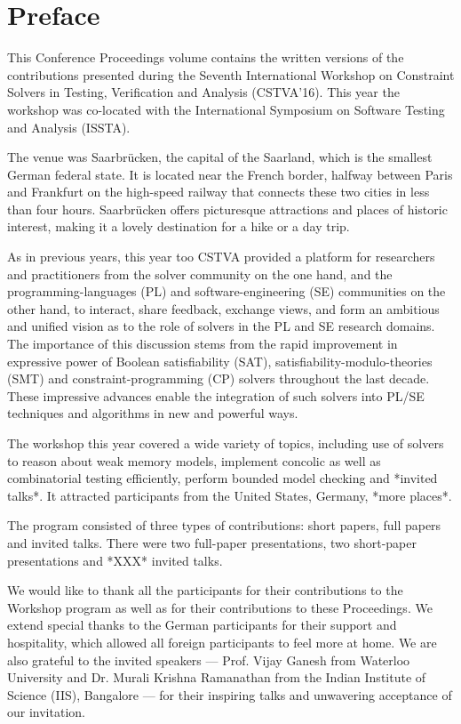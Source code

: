 \chapter*{Preface}
\setcounter{page}{1}
\pagestyle{plain}


This Conference Proceedings volume contains the written versions of the
contributions presented during the Seventh International Workshop on Constraint
Solvers in Testing, Verification and Analysis (CSTVA'16). This year the
workshop was co-located with the International Symposium on Software Testing
and Analysis (ISSTA).

The venue was Saarbr{\"u}cken, the capital of the Saarland, which is the
smallest German federal state. It is located near the French border, halfway
between Paris and Frankfurt on the high-speed railway that connects these two
cities in less than four hours. Saarbr{\"u}cken offers picturesque attractions
and places of historic interest, making it a lovely destination for a hike or a
day trip.  

As in previous years, this year too CSTVA provided a platform for researchers
and practitioners from the solver community on the one hand, and the
programming-languages (PL) and software-engineering (SE) communities on the
other hand, to interact, share feedback, exchange views, and form an ambitious
and unified vision as to the role of solvers in the PL and SE research
domains. The importance of this discussion stems from the rapid improvement in
expressive power of Boolean satisfiability (SAT),
satisfiability-modulo-theories (SMT) and constraint-programming (CP) solvers
throughout the last decade. These impressive advances enable the integration of
such solvers into PL/SE techniques and algorithms in new and powerful ways. 

The workshop this year covered a wide variety of topics, including use of
solvers to reason about weak memory models, implement concolic as well as
combinatorial testing efficiently, perform bounded model checking and *invited
talks*. It attracted participants from the United States, Germany, *more
places*. 

The program consisted of three types of contributions: short papers, full
papers and invited talks. There were two full-paper presentations, two
short-paper presentations and *XXX* invited talks. 

We would like to thank all the participants for their contributions to the
Workshop program as well as for their contributions to these Proceedings. We
extend special thanks to the German participants for their support and
hospitality, which allowed all foreign participants to feel more at home. We
are also grateful to the invited speakers --- Prof. Vijay Ganesh from Waterloo
University and Dr. Murali Krishna Ramanathan from the Indian Institute of
Science (IIS), Bangalore --- for their inspiring talks and unwavering
acceptance of our invitation.

